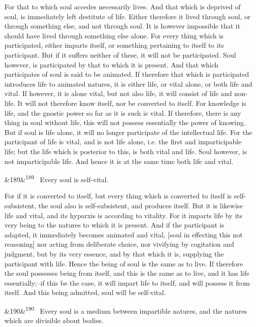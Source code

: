 \documentclass[12pt]{article}
\newcommand{\para}[1][]{\par\noindent\ifx&#1&\else\textsuperscript{\footnotesize #1}~\fi}
\begin{document}
For that to which soul accedes necessarily lives. And that which is deprived of soul, is immediately left destitute of life. Either therefore it lived through soul, or through something else, and not through soul. It is however impossible that it should have lived through something else alone. For every thing which is participated, either imparts itself, or something pertaining to itself to its participant. But if it suffers neither of these, it will not be participated. Soul however, is participated by that to which it is present. And that which participates of soul is said to be animated. If therefore that which is participated introduces life to animated natures, it is either life, or vital alone, or both life and vital. If however, it is alone vital, but not also life, it will consist of life and non-life. It will not therefore know itself, nor be converted to itself. For knowledge is life, and the gnostic power so far as it is such is vital. If therefore, there is any thing in soul without life, this will not possess essentially the power of knowing. But if soul is life alone, it will no longer participate of the intellectual life. For the participant of life is vital, and is not life alone, i.e. the first and imparticipable life; but the life which is posterior to this, is both vital and life. Soul however, is not imparticipable life. And hence it is at the same time both life and vital.

\para[189] Every soul is self-vital.

For if it is converted to itself, but every thing which is converted to itself is self-subsistent, the soul also is self-subsistent, and produces itself. But it is likewise life and vital, and its hyparxis is according to vitality. For it imparts life by its very being to the natures to which it is present. And if the participant is adapted, it immediately becomes animated and vital, [soul in effecting this not reasoning] nor acting from deliberate choice, nor vivifying by cogitation and judgment, but by its very essence, and by that which it is, supplying the participant with life. Hence the being of soul is the same as to live. If therefore the soul possesses being from itself, and this is the same as to live, and it has life essentially;--if this be the case, it will impart life to itself, and will possess it from itself. And this being admitted, soul will be self-vital.

\para[190] Every soul is a medium between impartible natures, and the natures which are divisible about bodies.
\end{document}
